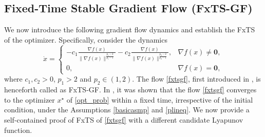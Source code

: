 \documentclass[letterpaper]{article}
\newtheorem{lemma}{Lemma} %
\begin{document}



\subsection{Fixed-Time Stable Gradient Flow (FxTS-GF)}
We now introduce the following gradient flow dynamics and establish the FxTS of the optimizer. Specifically, consider the dynamics
\begin{equation} \label{fxtsgf}
\dot{x} =\begin{cases}
-c_1\frac{\nabla f(x)}{\|\nabla f(x)\|^{\frac{p_1-2}{p_1-1}}} -c_2\frac{\nabla f(x)}{\|\nabla f(x)\|^{\frac{p_2-2}{p_2-1}}}, & \nabla f(x) \neq \bm{0},\\
0, & \nabla f(x) = \bm{0},
\end{cases} 
\end{equation}
where $c_1,c_2 >0$, $p_1>2$ and $p_2 \in (1,2)$. The flow \eqref{fxtsgf}, first introduced in \cite{kunal2021}, is henceforth called as FxTS-GF. In \cite{kunal2021}, it was shown that the flow \eqref{fxtsgf} converges to the optimizer $x^\star$ of \eqref{opt_prob} within a fixed time, irrespective of the initial condition, under the Assumptions \ref{basicasmp} and \ref{plineq}. We now provide a self-contained proof of FxTS of \eqref{fxtsgf} with a different candidate Lyapunov function.

\end{document}
